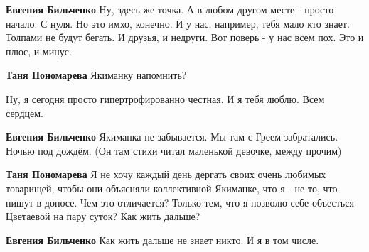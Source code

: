 \begin{itemize}
\begin{itemize}
\textbf{Евгения Бильченко} Ну, здесь же точка. А в любом другом месте - просто
начало. С нуля. Но это имхо, конечно. И у нас, например, тебя мало кто знает.
Толпами не будут бегать. И друзья, и недруги. Вот поверь - у нас всем пох. Это
и плюс, и минус.

 
\textbf{Таня Пономарева} Якиманку напомнить?

 
Ну, я сегодня просто гипертрофированно честная. И я тебя люблю. Всем сердцем.

 
\textbf{Евгения Бильченко} Якиманка не забывается. Мы там с Греем забратались.
Ночью под дождём. (Он там стихи читал маленькой девочке, между прочим)

 
\textbf{Таня Пономарева} Я не хочу каждый день дергать своих очень любимых
товарищей, чтобы они объясняли коллективной Якиманке, что я - не то, что пишут
в доносе. Чем это отличается? Только тем, что я позволю себе объесться
Цветаевой на пару суток? Как жить дальше?

 
\textbf{Евгения Бильченко} Как жить дальше не знает никто. И я в том числе.


\end{itemize}
\end{itemize}
